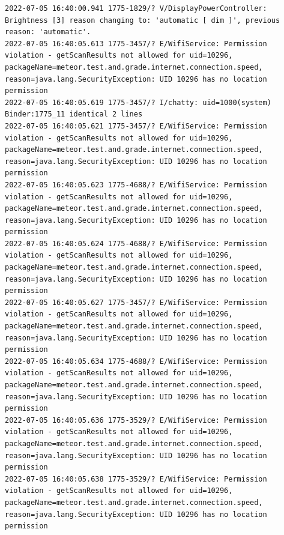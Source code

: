 \documentclass[a4paper,12pt]{book}
\begin{document}
\begin{lstlisting}
2022-07-05 16:40:00.941 1775-1829/? V/DisplayPowerController: Brightness [3] reason changing to: 'automatic [ dim ]', previous reason: 'automatic'.
2022-07-05 16:40:05.613 1775-3457/? E/WifiService: Permission violation - getScanResults not allowed for uid=10296, packageName=meteor.test.and.grade.internet.connection.speed, reason=java.lang.SecurityException: UID 10296 has no location permission
2022-07-05 16:40:05.619 1775-3457/? I/chatty: uid=1000(system) Binder:1775_11 identical 2 lines
2022-07-05 16:40:05.621 1775-3457/? E/WifiService: Permission violation - getScanResults not allowed for uid=10296, packageName=meteor.test.and.grade.internet.connection.speed, reason=java.lang.SecurityException: UID 10296 has no location permission
2022-07-05 16:40:05.623 1775-4688/? E/WifiService: Permission violation - getScanResults not allowed for uid=10296, packageName=meteor.test.and.grade.internet.connection.speed, reason=java.lang.SecurityException: UID 10296 has no location permission
2022-07-05 16:40:05.624 1775-4688/? E/WifiService: Permission violation - getScanResults not allowed for uid=10296, packageName=meteor.test.and.grade.internet.connection.speed, reason=java.lang.SecurityException: UID 10296 has no location permission
2022-07-05 16:40:05.627 1775-3457/? E/WifiService: Permission violation - getScanResults not allowed for uid=10296, packageName=meteor.test.and.grade.internet.connection.speed, reason=java.lang.SecurityException: UID 10296 has no location permission
2022-07-05 16:40:05.634 1775-4688/? E/WifiService: Permission violation - getScanResults not allowed for uid=10296, packageName=meteor.test.and.grade.internet.connection.speed, reason=java.lang.SecurityException: UID 10296 has no location permission
2022-07-05 16:40:05.636 1775-3529/? E/WifiService: Permission violation - getScanResults not allowed for uid=10296, packageName=meteor.test.and.grade.internet.connection.speed, reason=java.lang.SecurityException: UID 10296 has no location permission
2022-07-05 16:40:05.638 1775-3529/? E/WifiService: Permission violation - getScanResults not allowed for uid=10296, packageName=meteor.test.and.grade.internet.connection.speed, reason=java.lang.SecurityException: UID 10296 has no location permission

\end{lstlisting}
\end{document}
